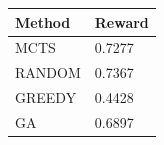 \begin{tabular}{ll}
\hline
Method & Reward \\
\hline
  MCTS & 0.7277 \\
  RANDOM & 0.7367 \\
  GREEDY & 0.4428 \\
  GA & 0.6897 \\
\hline
\end{tabular}
